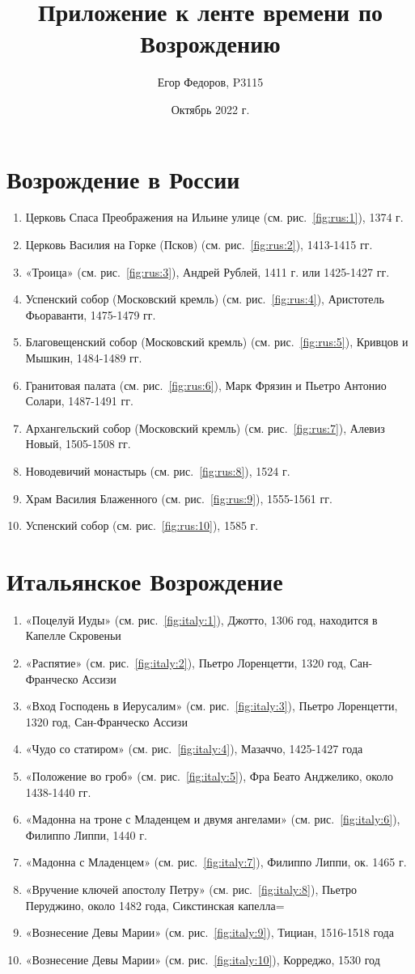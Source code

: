 \documentclass[a4paper,14pt]{article}
\title{Приложение к ленте времени по Возрождению}
\author{Егор Федоров, P3115}
\date{Октябрь 2022 г.}
\begin{document}
\pagestyle{fancy}
\section*{Возрождение в России}

\begin{enumerate}
    \item Церковь Спаса Преображения на Ильине улице (см. рис.~\ref{fig:rus:1}), 1374 г.
    \item Церковь Василия на Горке (Псков) (см. рис.~\ref{fig:rus:2}), 1413-1415 гг.
    \item «Троица» (см. рис.~\ref{fig:rus:3}), Андрей Рублей, 1411 г. или 1425-1427 гг.
    \item Успенский собор (Московский кремль) (см. рис.~\ref{fig:rus:4}), Аристотель Фьораванти, 1475-1479 гг.
    \item Благовещенский собор (Московский кремль) (см. рис.~\ref{fig:rus:5}), Кривцов и Мышкин, 1484-1489 гг.
    \item Гранитовая палата (см. рис.~\ref{fig:rus:6}), Марк Фрязин и Пьетро Антонио Солари, 1487-1491 гг.
    \item Архангельский собор (Московский кремль) (см. рис.~\ref{fig:rus:7}), Алевиз Новый, 1505-1508 гг.
    \item Новодевичий монастырь (см. рис.~\ref{fig:rus:8}), 1524 г.
    \item Храм Василия Блаженного (см. рис.~\ref{fig:rus:9}), 1555-1561 гг.
    \item Успенский собор (см. рис.~\ref{fig:rus:10}), 1585 г.
\end{enumerate}

\section*{Итальянское Возрождение}
\begin{enumerate}
\item «Поцелуй Иуды» (см. рис.~\ref{fig:italy:1}), Джотто, 1306 год, находится в Капелле Скровеньи
\item «Распятие» (см. рис.~\ref{fig:italy:2}), Пьетро Лоренцетти, 1320 год, Сан-Франческо Ассизи
\item «Вход Господень в Иерусалим» (см. рис.~\ref{fig:italy:3}), Пьетро Лоренцетти, 1320 год, Сан-Франческо Ассизи
\item «Чудо со статиром» (см. рис.~\ref{fig:italy:4}), Мазаччо, 1425-1427 года
\item «Положение во гроб» (см. рис.~\ref{fig:italy:5}), Фра Беато Анджелико, около 1438-1440 гг.
\item «Мадонна на троне с Младенцем и двумя ангелами» (см. рис.~\ref{fig:italy:6}), Филиппо Липпи, 1440 г.
\item «Мадонна с Младенцем» (см. рис.~\ref{fig:italy:7}), Филиппо Липпи, ок. 1465 г.
\item «Вручение ключей апостолу Петру» (см. рис.~\ref{fig:italy:8}), Пьетро Перуджино, около 1482 года, Сикстинская капелла=
\item «Вознесение Девы Марии» (см. рис.~\ref{fig:italy:9}), Тициан, 1516-1518 года
\item «Вознесение Девы Марии» (см. рис.~\ref{fig:italy:10}), Корреджо, 1530 год
\end{enumerate}
\end{document}
